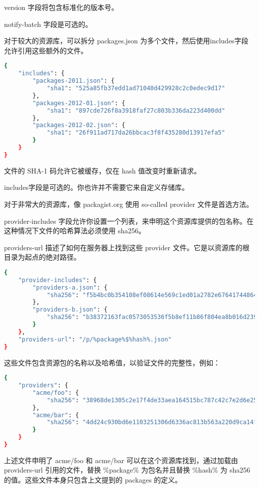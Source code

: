 version 字段将包含标准化的版本号。

notify-batch 字段是可选的。


对于较大的资源库，可以拆分 packages.json 为多个文件，然后使用includes字段允许引用这些额外的文件。


\begin{lstlisting}[language=bash]
{
    "includes": {
        "packages-2011.json": {
            "sha1": "525a85fb37edd1ad71040d429928c2c0edec9d17"
        },
        "packages-2012-01.json": {
            "sha1": "897cde726f8a3918faf27c803b336da223d400dd"
        },
        "packages-2012-02.json": {
            "sha1": "26f911ad717da26bbcac3f8f435280d13917efa5"
        }
    }
}
\end{lstlisting}

文件的 SHA-1 码允许它被缓存，仅在 hash 值改变时重新请求。

includes字段是可选的。你也许并不需要它来自定义存储库。



对于非常大的资源库，像 packagist.org 使用 so-called provider 文件是首选方法。

provider-includes 字段允许你设置一个列表，来申明这个资源库提供的包名称。在这种情况下文件的哈希算法必须使用 sha256。

providers-url 描述了如何在服务器上找到这些 provider 文件。它是以资源库的根目录为起点的绝对路径。

\begin{lstlisting}[language=bash]
{
    "provider-includes": {
        "providers-a.json": {
            "sha256": "f5b4bc0b354108ef08614e569c1ed01a2782e67641744864a74e788982886f4c"
        },
        "providers-b.json": {
            "sha256": "b38372163fac0573053536f5b8ef11b86f804ea8b016d239e706191203f6efac"
        }
    },
    "providers-url": "/p/%package%$%hash%.json"
}
\end{lstlisting}

这些文件包含资源包的名称以及哈希值，以验证文件的完整性，例如：



\begin{lstlisting}[language=bash]
{
    "providers": {
        "acme/foo": {
            "sha256": "38968de1305c2e17f4de33aea164515bc787c42c7e2d6e25948539a14268bb82"
        },
        "acme/bar": {
            "sha256": "4dd24c930bd6e1103251306d6336ac813b563a220d9ca14f4743c032fb047233"
        }
    }
}
\end{lstlisting}

上述文件申明了 acme/foo 和 acme/bar 可以在这个资源库找到，通过加载由 providers-url 引用的文件，替换 \%package\% 为包名并且替换 \%hash\% 为 sha256 的值。这些文件本身只包含上文提到的 packages 的定义。

